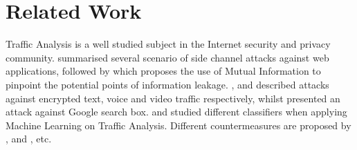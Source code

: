 \section{Related Work \label{RelatedWork}}
Traffic Analysis is a well studied subject in the Internet security and privacy community. \cite{WebSidechannel} summarised several scenario of side channel attacks against web applications, followed by \cite{PinpointWeb} which proposes the use of Mutual Information to pinpoint the potential points of information leakage. \cite{AppleMsg}, \cite{Language} and \cite{VideoTraffic} described attacks against encrypted text, voice and video traffic respectively, whilst \cite{SuggestBox} presented an attack against Google search box. \cite{HClassifier} and \cite{Peekaboo} studied different classifiers when applying Machine Learning on Traffic Analysis. Different countermeasures are proposed by \cite{TrafficMorphing}, \cite{HTTPOS} and \cite{FTE}, etc.

